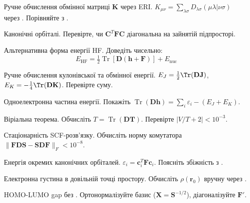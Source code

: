 \begin{tasks}
    \item Ручне обчислення обмінної матриці $\mathbf{K}$ через ERI.
    $K_{\mu\nu} = \sum_{\lambda\sigma} D_{\lambda\sigma} (\mu\lambda|\nu\sigma)$ через . Порівняйте з .

    \item Канонічні орбіталі.
    Перевірте, чи $\mathbf{C}^T \mathbf{F} \mathbf{C}$ діагональна на зайнятій підпросторі.

    \item Альтернативна форма енергії HF.
    Доведіть чисельно:
    \[
        E_{\text{HF}} = \tfrac{1}{2} \operatorname{Tr}[\mathbf{D} (\mathbf{h} + \mathbf{F})] + E_{\text{nuc}}
    \]

    \item Ручне обчислення кулонівської та обмінної енергії.
    $E_J = \tfrac{1}{2} \Tr(\mathbf{D}\mathbf{J})$, $E_K = -\tfrac{1}{4} \Tr(\mathbf{D}\mathbf{K})$. Перевірте суму.

    \item Одноелектронна частина енергії.
    Покажіть $\operatorname{Tr}(\mathbf{D} \mathbf{h}) = \sum_i \varepsilon_i - (E_J + E_K)$.

    \item Віріальна теорема.
    Обчисліть $T = \operatorname{Tr}(\mathbf{D} \mathbf{T})$. Перевірте $|V/T + 2| < 10^{-3}$.

    \item Стаціонарність SCF-розв’язку.
    Обчисліть норму комутатора $\|\mathbf{F}\mathbf{D}\mathbf{S} - \mathbf{S}\mathbf{D}\mathbf{F}\|_F < 10^{-8}$.

    \item Енергія окремих канонічних орбіталей.
    $\varepsilon_i = \mathbf{c}_i^T \mathbf{F} \mathbf{c}_i$. Поясніть збіжність з .


    \item Електронна густина в довільній точці простору.
    Обчисліть $\rho(\mathbf{r}_0)$ вручну через .

    \item HOMO-LUMO gap без .
    Ортонормалізуйте базис ($\mathbf{X}=\mathbf{S}^{-1/2}$), діагоналізуйте $\mathbf{F}'$.


\end{tasks}
